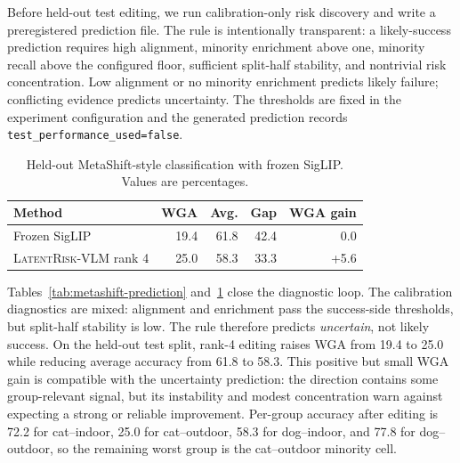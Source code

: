 Before held-out test editing, we run calibration-only risk discovery and write a preregistered prediction file. The rule is intentionally transparent: a likely-success prediction requires high alignment, minority enrichment above one, minority recall above the configured floor, sufficient split-half stability, and nontrivial risk concentration. Low alignment or no minority enrichment predicts likely failure; conflicting evidence predicts uncertainty. The thresholds are fixed in the experiment configuration and the generated prediction records \texttt{test\_performance\_used=false}.

\begin{table}[t]
\centering
\caption{Diagnostic prediction and held-out outcome on the MetaShift-style cat/dog shift with frozen SigLIP. The prediction is generated before final test editing. WGA gain is relative to frozen SigLIP on the same test split.}
\label{tab:metashift-prediction}
\footnotesize
\setlength{\tabcolsep}{4pt}
\end{table}

\begin{table}[t]
\centering
\caption{Held-out MetaShift-style classification with frozen SigLIP. Values are percentages.}
\label{tab:metashift-results}
\footnotesize
\setlength{\tabcolsep}{4pt}
\begin{tabular*}{\columnwidth}{@{\extracolsep{\fill}}lrrrr@{}}
\toprule
Method & WGA & Avg. & Gap & WGA gain \\
\midrule
Frozen SigLIP & 19.4 & 61.8 & 42.4 & 0.0 \\
\textsc{LatentRisk-VLM} rank 4 & 25.0 & 58.3 & 33.3 & +5.6 \\
\bottomrule
\end{tabular*}
\end{table}

Tables~\ref{tab:metashift-prediction} and~\ref{tab:metashift-results} close the diagnostic loop. The calibration diagnostics are mixed: alignment and enrichment pass the success-side thresholds, but split-half stability is low. The rule therefore predicts \emph{uncertain}, not likely success. On the held-out test split, rank-4 editing raises WGA from 19.4 to 25.0 while reducing average accuracy from 61.8 to 58.3. This positive but small WGA gain is compatible with the uncertainty prediction: the direction contains some group-relevant signal, but its instability and modest concentration warn against expecting a strong or reliable improvement. Per-group accuracy after editing is 72.2 for cat--indoor, 25.0 for cat--outdoor, 58.3 for dog--indoor, and 77.8 for dog--outdoor, so the remaining worst group is the cat--outdoor minority cell.

